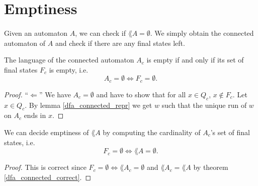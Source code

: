 

        \section{Emptiness}
        \paragraph{}
        Given an automaton $A$, we can check if $\lang{A} = \emptyset$. We simply obtain the connected automaton of $A$ and check if there are any final states left. 

    \begin{lemma}
        \label{dfa_lang_empty}
        The language of the connected automaton $A_c$ is empty if and only if its set of final states $F_c$ is empty, i.e.
        \begin{equation*}
            A_c = \emptyset \iff F_c = \emptyset.
        \end{equation*}
    \end{lemma}

    \begin{proof}
        ``$\Leftarrow$''
        We have $A_c = \emptyset$ and have to show that for all $x \in Q_c$, $x \notin F_c$.
        Let $x \in Q_c$. 
        By lemma \ref{dfa_connected_repr} we get $w$ such that the unique run of $w$ on $A_c$
        ends in $x$.
    \end{proof}


        \begin{theorem} We can decide emptiness of $\lang{A}$ by computing the cardinality of $A_c$'s set of final states, i.e.
            \label{AutomatonEmpty}
            \begin{equation*}        
                F_c = \emptyset \Longleftrightarrow \lang{A} = \emptyset.       
            \end{equation*}
            \end{theorem}

            \begin{proof}
                This is correct since $F_c = \emptyset \Leftrightarrow \lang{A_c} = \emptyset$ and $\lang{A_c} = \lang{A}$ by theorem \ref{dfa_connected_correct}.
            \end{proof}


